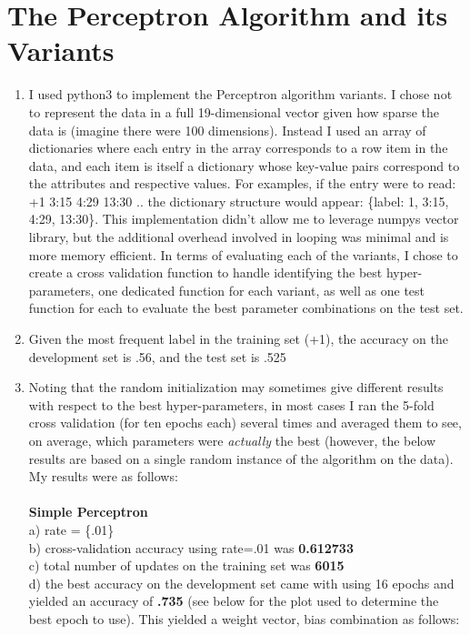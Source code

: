 \documentclass[11pt,a4paper]{article}
\begin{document}
	\section{The Perceptron Algorithm and its Variants}
		\begin{enumerate}
			\item I used python3 to implement the Perceptron algorithm variants. I chose not to represent the data in a full 19-dimensional vector given how sparse the data is (imagine there were 100 dimensions). Instead I used an array of dictionaries where each entry in the array corresponds to a row item in the data, and each item is itself a dictionary whose key-value pairs correspond to the attributes and respective values. For examples, if the entry were to read: +1 3:15 4:29 13:30 .. the dictionary structure would appear: \{label: 1, 3:15, 4:29, 13:30\}. This implementation didn't allow me to leverage numpys vector library, but the additional overhead involved in looping was minimal and is more memory efficient. In terms of evaluating each of the variants, I chose to create a cross validation function to handle identifying the best hyper-parameters, one dedicated function for each variant, as well as one test function for each to evaluate the best parameter combinations on the test set.
			\item Given the most frequent label in the training set (+1), the accuracy on the development set is .56, and the test set is .525
			\item Noting that the random initialization may sometimes give different results with respect to the best hyper-parameters, in most cases I ran the 5-fold cross validation (for ten epochs each) several times and averaged them to see, on average, which parameters were \textit{actually} the best (however, the below results are based on a single random instance of the algorithm on the data). My results were as follows:\\ \\
			\textbf{Simple Perceptron}    \\
			a) rate = \{.01\}  \\
			b) cross-validation accuracy using rate=.01 was \textbf{0.612733}\\
			c) total number of updates on the training set was \textbf{6015}\\
			d) the best accuracy on the development set came with using 16 epochs and yielded an accuracy of \textbf{.735} (see below for the plot used to determine the best epoch to use). This yielded a weight vector, bias combination as follows:\\

\end{enumerate}
\end{document}
